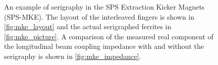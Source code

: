 \begin{figure}
\begin{center}
\end{center}
\caption{An example of serigraphy in the SPS Extraction Kicker Magnets (SPS-MKE). The layout of the interleaved fingers is shown in \ref{fig:mke_layout} and the actual serigraphed ferrites in \ref{fig:mke_picture}. A comparison of the measured real component of the longitudinal beam coupling impedance with and without the serigraphy is shown in \ref{fig:mke_impedance}.}
\label{fig:mke_figures}
\end{figure}

